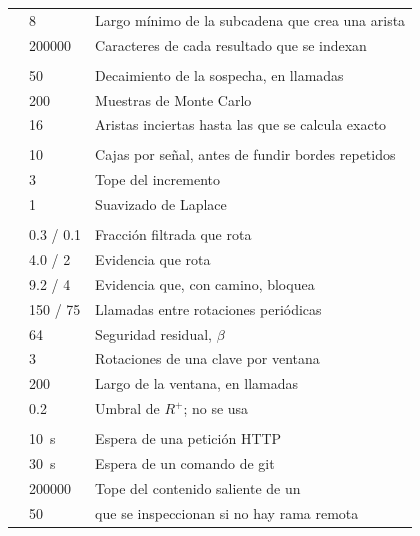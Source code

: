 \begin{small}
\begin{longtable}{@{}P{4.3cm}P{2.5cm}P{8.0cm}@{}}
 & 8 & Largo mínimo de la subcadena que crea una arista \\
 & \num{200000} & Caracteres de cada resultado que se indexan \\
\addlinespace
{} \\
 & 50 & Decaimiento de la sospecha, en llamadas \\
 & 200 & Muestras de Monte Carlo \\
 & 16 & Aristas inciertas hasta las que se calcula exacto \\
\addlinespace
{} \\
 & 10 & Cajas por señal, antes de fundir bordes repetidos \\
 & 3 & Tope del incremento \\
 & 1 & Suavizado de Laplace \\
\addlinespace
{} \\
 & \num{0.3} / \num{0.1} & Fracción filtrada que rota \\
 & \num{4.0} / 2 & Evidencia que rota \\
 & \num{9.2} / 4 & Evidencia que, con camino, bloquea \\
 & 150 / 75 & Llamadas entre rotaciones periódicas \\
 & 64 & Seguridad residual, $\beta$ \\
 & 3 & Rotaciones de una clave por ventana \\
 & 200 & Largo de la ventana, en llamadas \\
 & \num{0.2} & Umbral de $R^{+}$; no se usa \\
\addlinespace
{} \\
 & 10~s & Espera de una petición HTTP \\
 & 30~s & Espera de un comando de git \\
 & \num{200000} & Tope del contenido saliente de un  \\
 & 50 &  que se inspeccionan si no hay rama remota \\

\end{longtable}
\end{small}
